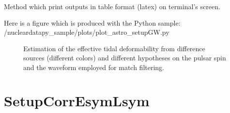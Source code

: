 \documentclass[letterpaper,10pt,english]{sphinxmanual}
\begin{document}
\begin{fulllineitems}
\begin{fulllineitems}
\end{fulllineitems}


\begin{fulllineitems}
\label{\detokenize{source/api/setup_astro_gw:nucleardatapy.astro.setup_gw.setupGWAverage.print_table}}
\pysigstartsignatures
{}
\pysigstopsignatures
\sphinxAtStartPar
Method which print outputs in table format (latex) on terminal’s screen.

\end{fulllineitems}


\end{fulllineitems}


\sphinxAtStartPar
Here is a figure which is produced with the Python sample: /nucleardatapy\_sample/plots/plot\_astro\_setupGW.py

\begin{figure}[htbp]
\centering
\capstart

\noindent{}
\caption{Estimation of the effective tidal deformability from difference sources (different colors) and different hypotheses on the pulsar spin and the waveform employed for match filtering.}\label{\detokenize{source/api/setup_astro_gw:id1}}\end{figure}

\sphinxstepscope


\section{SetupCorrEsymLsym}
\label{\detokenize{source/api/setup_corr_EsymLsym:setupcorresymlsym}}\label{\detokenize{source/api/setup_corr_EsymLsym::doc}}\label{\detokenize{source/api/setup_corr_EsymLsym:module-nucleardatapy.corr.setup_EsymLsym}}
\end{document}
